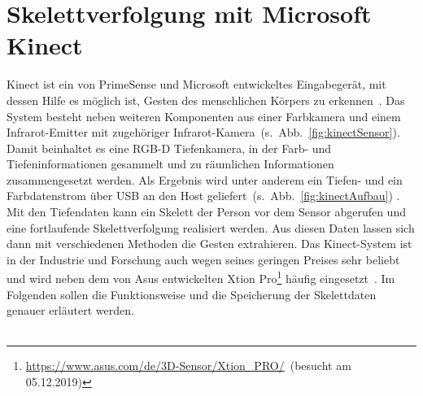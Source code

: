 \section{Skelettverfolgung mit Microsoft Kinect}\label{Tracking}
Kinect ist ein von PrimeSense und Microsoft entwickeltes Eingabegerät, mit dessen Hilfe es möglich ist, Gesten des menschlichen Körpers zu erkennen~\cite{hannaKinect1}. Das System besteht neben weiteren Komponenten aus einer Farbkamera und einem Infrarot-Emitter mit zugehöriger Infrarot-Kamera~(s.~Abb.~\ref{fig:kinectSensor}). Damit beinhaltet es eine RGB-D Tiefenkamera, in der Farb- und Tiefeninformationen gesammelt und zu räumlichen Informationen zusammengesetzt werden. Als Ergebnis wird unter anderem ein Tiefen- und ein Farbdatenstrom über USB an den Host geliefert~(s.~Abb.~\ref{fig:kinectAufbau}) \cite{hannaKinect1}. Mit den Tiefendaten kann ein Skelett der Person vor dem Sensor abgerufen und eine fortlaufende Skelettverfolgung realisiert werden. Aus diesen Daten lassen sich dann mit verschiedenen Methoden die Gesten extrahieren. Das Kinect-System ist in der Industrie und Forschung auch wegen seines geringen Preises sehr beliebt und wird neben dem von Asus entwickelten Xtion Pro\footnote{\url{https://www.asus.com/de/3D-Sensor/Xtion_PRO/}~(besucht am 05.12.2019)} häufig eingesetzt~\cite{hannaKinect1}. Im Folgenden sollen die Funktionsweise und die Speicherung der Skelettdaten genauer erläutert werden.~\cite{cruzkinect}
\\ \\
